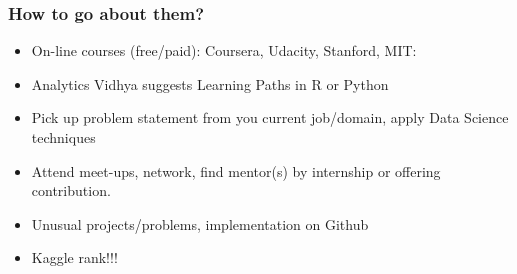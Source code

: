  


 
 



\begin{frame}[fragile]\frametitle{How to go about them?}
\begin{itemize}
\item On-line courses (free/paid): Coursera, Udacity, Stanford, MIT: 
\item Analytics Vidhya suggests Learning Paths in R or Python
\item Pick up problem statement from you current job/domain, apply Data Science techniques
\item Attend meet-ups, network, find mentor(s) by internship or offering contribution.
\item Unusual projects/problems, implementation on Github
\item Kaggle rank!!!
\end{itemize}

\end{frame}

